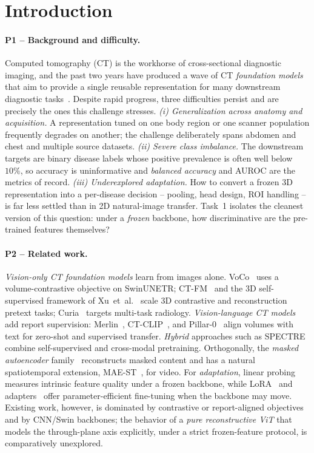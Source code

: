 \documentclass[runningheads]{llncs}
\begin{document}
\section{Introduction}

\paragraph{P1 -- Background and difficulty.}
Computed tomography (CT) is the workhorse of cross-sectional diagnostic imaging,
and the past two years have produced a wave of CT \emph{foundation models} that
aim to provide a single reusable representation for many downstream diagnostic
tasks~\cite{voco,ctfm,merlin,ctclip,pillar0}. Despite rapid progress, three
difficulties persist and are precisely the ones this challenge stresses.
\emph{(i) Generalization across anatomy and acquisition.} A representation tuned
on one body region or one scanner population frequently degrades on another;
the challenge deliberately spans abdomen and chest and multiple source datasets.
\emph{(ii) Severe class imbalance.} The downstream targets are binary disease
labels whose positive prevalence is often well below $10\%$, so accuracy is
uninformative and \emph{balanced accuracy} and AUROC are the metrics of record.
\emph{(iii) Underexplored adaptation.} How to convert a frozen 3D representation
into a per-disease decision -- pooling, head design, ROI handling -- is far less
settled than in 2D natural-image transfer. Task~1 isolates the cleanest version
of this question: under a \emph{frozen} backbone, how discriminative are the
pre-trained features themselves?

\paragraph{P2 -- Related work.}
\emph{Vision-only CT foundation models} learn from images alone. VoCo~\cite{voco}
uses a volume-contrastive objective on SwinUNETR; CT-FM~\cite{ctfm} and the 3D
self-supervised framework of Xu~et~al.~\cite{ctfm_xu} scale 3D contrastive and
reconstruction pretext tasks; Curia~\cite{curia} targets multi-task radiology.
\emph{Vision-language CT models} add report supervision: Merlin~\cite{merlin},
CT-CLIP~\cite{ctclip}, and Pillar-0~\cite{pillar0} align volumes with text for
zero-shot and supervised transfer. \emph{Hybrid} approaches such as
SPECTRE~\cite{SPECTRE} combine self-supervised and cross-modal pretraining.
Orthogonally, the \emph{masked autoencoder} family~\cite{mae} reconstructs
masked content and has a natural spatiotemporal extension, MAE-ST~\cite{maest},
for video. For \emph{adaptation}, linear probing~\cite{linearprobing} measures
intrinsic feature quality under a frozen backbone, while LoRA~\cite{lora} and
adapters~\cite{adapter} offer parameter-efficient fine-tuning when the backbone
may move. Existing work, however, is dominated by contrastive or
report-aligned objectives and by CNN/Swin backbones; the behavior of a
\emph{pure reconstructive ViT} that models the through-plane axis explicitly,
under a strict frozen-feature protocol, is comparatively unexplored.
\end{document}
